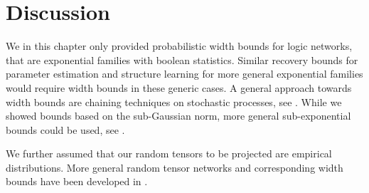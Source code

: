 \section{Discussion}

We in this chapter only provided probabilistic width bounds for logic networks, that are exponential families with boolean statistics.
Similar recovery bounds for parameter estimation and structure learning for more general exponential families would require width bounds in these generic cases.
A general approach towards width bounds are chaining techniques on stochastic processes, see \cite{talagrand_upper_2014}.
While we showed bounds based on the sub-Gaussian norm, more general sub-exponential bounds could be used, see \cite{wainwright_high-dimensional_2019}.

We further assumed that our random tensors to be projected are empirical distributions.
More general random tensor networks and corresponding width bounds have been developed in \cite{goesmann_uniform_2021}.
